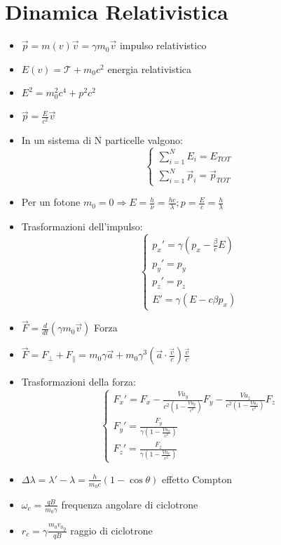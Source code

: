 \documentclass[a4paper]{article}
\begin{document}
    \section{Dinamica Relativistica}
        \begin{itemize}
            \item $\vec{p}=m(v)\vec{v}=\gamma m_0\vec{v}$ impulso relativistico
            \item $E(v)=\mathcal{T}+m_0c^2$ energia relativistica
            \item $E^2=m_0^2c^4+p^2c^2$
            \item $\vec{p}=\frac{E}{c^2}\vec{v}$
            \item In un sistema di N particelle valgono:\\
                $$\begin{cases}
                    \sum_{i=1}^{N}E_i=E_{TOT}\\
                    \sum_{i=1}^{N}\vec{p}_i=\vec{p}_{TOT}
                \end{cases}$$
            \item Per un fotone $m_0=0\Rightarrow E=\frac{h}{\nu}=\frac{hc}{\lambda}; p=\frac{E}{c}=\frac{h}{\lambda}$ 
            \item Trasformazioni dell'impulso:\\
                $$\begin{cases}
                    p_x'=\gamma\left(p_x-\frac{\beta}{c}E\right)\\
                    p_y'=p_y\\
                    p_z'=p_z\\
                    E'=\gamma(E-c\beta p_x)
                \end{cases}$$
            \item $\vec{F}=\frac{d}{dt}(\gamma m_0\vec{v})$ Forza
            \item $\vec{F}=F_\perp+F_\|=m_0\gamma\vec{a}+m_0\gamma^3\left(\vec{a}\cdot\frac{\vec{v}}{c}\right)\frac{\vec{v}}{c}$
            \item Trasformazioni della forza:\\
                $$\begin{cases}
                    F_x'=F_x-\frac{Vu_y}{c^2\left(1-\frac{Vu_y}{c^2}\right)}F_y-\frac{Vu_z}{c^2\left(1-\frac{Vu_z}{c^2}\right)}F_z\\
                    F_y'=\frac{F_y}{\gamma\left(1-\frac{Vu_x}{c^2}\right)}\\
                    F_z'=\frac{F_z}{\gamma\left(1-\frac{Vu_x}{c^2}\right)}
                \end{cases}$$
            \item $\Delta\lambda=\lambda'-\lambda=\frac{h}{m_0c}(1-\cos{\theta})$ effetto Compton
            \item $\omega_c=\frac{qB}{m_0\gamma}$ frequenza angolare di ciclotrone
            \item $r_c=\gamma\frac{m_0{v_0}_y}{qB}$ raggio di ciclotrone
        \end{itemize}
\end{document}
